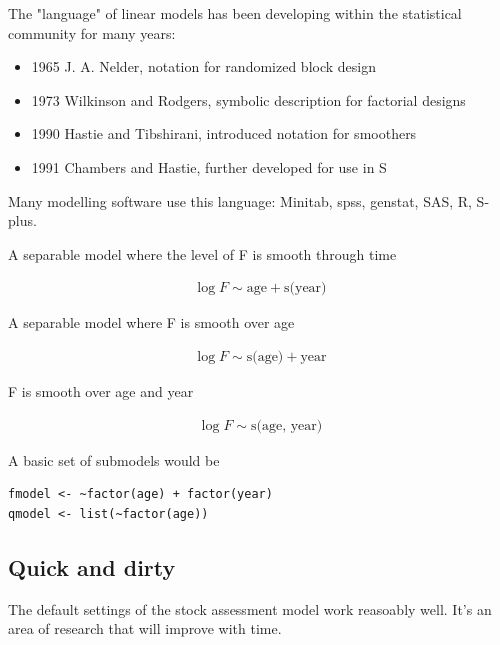 \documentclass[a4paper,english,10pt]{article}\usepackage[]{graphicx}\usepackage[]{color}
\makeatletter
\newenvironment{kframe}{%
 \def\at@end@of@kframe{}%
 \ifinner\ifhmode%
  \def\at@end@of@kframe{\end{minipage}}%
  \begin{minipage}{\columnwidth}%
 \fi\fi%
 \def\FrameCommand##1{\hskip\@totalleftmargin \hskip-\fboxsep
 \colorbox{shadecolor}{##1}\hskip-\fboxsep
     \hskip-\linewidth \hskip-\@totalleftmargin \hskip\columnwidth}%
 \MakeFramed {\advance\hsize-\width
   \@totalleftmargin\z@ \linewidth\hsize
   \@setminipage}}%
 {\par\unskip\endMakeFramed%
 \at@end@of@kframe}
\newenvironment{knitrout}{}{} %
\makeatother
\begin{document}
The "language" of linear models has been developing within the statistical community for many years:

  \begin{itemize}
  \item 1965 J. A. Nelder, notation for randomized block design
  \item 1973 Wilkinson and Rodgers, symbolic description for factorial designs
  \item 1990 Hastie and Tibshirani, introduced notation for smoothers
  \item 1991 Chambers and Hastie, further developed for use in S
  \end{itemize}

Many modelling software use this language:  Minitab, spss, genstat, SAS, R, S-plus.

A separable model where the level of F is smooth through time

\begin{align*}
  \log F \sim \text{age} + \text{s(year)}
\end{align*}

A separable model where F is smooth over age

\begin{align*}
  \log F \sim \text{s(age)} + \text{year}
\end{align*}

F is smooth over age and year

\begin{align*}
  \log F \sim \text{s(age, year)}
\end{align*}

A basic set of submodels would be

\begin{knitrout}
\color{fgcolor}\begin{kframe}
\begin{verbatim}
fmodel <- ~factor(age) + factor(year)
qmodel <- list(~factor(age))
\end{verbatim}
\end{kframe}
\end{knitrout}


\subsection{Quick and dirty}

The default settings of the stock assessment model work reasoably well. It's an area of research that will improve with time.
\end{document}
